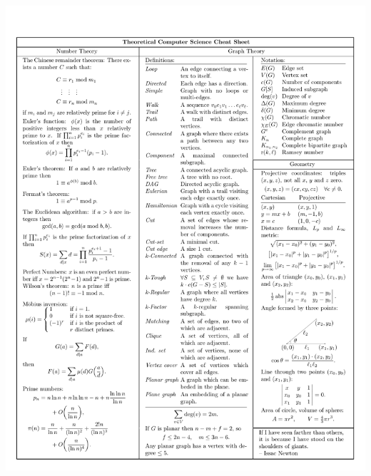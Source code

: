 \documentclass[10pt]{article}
\begin{document}
\centerline{\includegraphics[trim={0 0 0 3cm}, clip, width=\textwidth]{cheatsheet/p05.pdf}}
\end{document}
